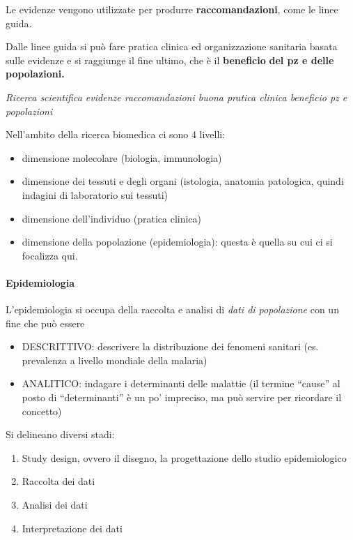 Le evidenze vengono utilizzate per produrre \textbf{raccomandazioni},
come le linee guida.

Dalle linee guida si può fare pratica clinica ed organizzazione
sanitaria basata sulle evidenze e si raggiunge il fine ultimo, che è il
\textbf{beneficio} \textbf{del pz e delle popolazioni.}

\emph{Ricerca scientifica evidenze raccomandazioni buona pratica clinica
beneficio pz e popolazioni}

Nell'ambito della ricerca biomedica ci sono 4 livelli:

\begin{itemize}
\item
  dimensione molecolare (biologia, immunologia)
\item
  dimensione dei tessuti e degli organi (istologia, anatomia patologica,
  quindi indagini di laboratorio sui tessuti)
\item
  dimensione dell'individuo (pratica clinica)
\item
  dimensione della popolazione (epidemiologia): questa è quella su cui
  ci si focalizza qui.
\end{itemize}

\paragraph{Epidemiologia }


L'epidemiologia si occupa della raccolta e analisi di \emph{dati di
popolazione} con un fine che può essere

\begin{itemize}
\item
  DESCRITTIVO: descrivere la distribuzione dei fenomeni sanitari (es.
  prevalenza a livello mondiale della malaria)
\item
  ANALITICO: indagare i determinanti delle malattie (il termine
  ``cause'' al posto di ``determinanti'' è un po' impreciso, ma può
  servire per ricordare il concetto)
\end{itemize}

Si delineano diversi stadi:

\begin{enumerate}
\def\labelenumi{\arabic{enumi}.}
\item
  Study design, ovvero il disegno, la progettazione dello studio
  epidemiologico
\item
  Raccolta dei dati
\item
  Analisi dei dati
\item
  Interpretazione dei dati
\end{enumerate}

